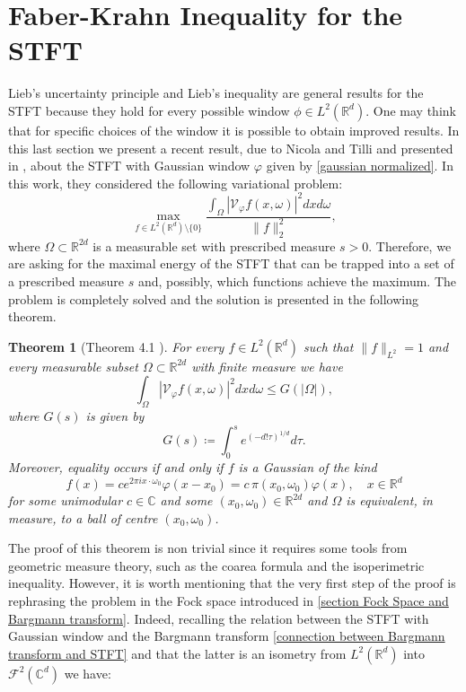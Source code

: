 \documentclass[corpo=11pt, stile=classica, tipotesi=custom,
greek, evenboxes, english]{toptesi}
\numberwithin{equation}{chapter}
\newtheorem{teo}{Theorem}[chapter] %
\theoremstyle{definition}
\theoremstyle{remark}
\newcommand{\R}{\mathbb{R}} %
\newcommand{\V}{\mathcal{V}} %
\newcommand{\Fock}{\mathcal{F}} %
\newcommand{\C}{\mathbb{C}} %
\newcommand{\dxdo}{dxd\omega}
\begin{document}
\section{Faber-Krahn Inequality for the STFT}\label{section Faber-Krahn inequality fot STFT}
Lieb's uncertainty principle and Lieb's inequality are general results for the STFT because they hold for every possible window $\phi \in L^2(\R^d)$. One may think that for specific choices of the window it is possible to obtain improved results. In this last section we present a recent result, due to Nicola and Tilli and presented in \cite{nicolatilli_fk}, about the STFT with Gaussian window $\varphi$ given by \eqref{gaussian normalized}. In this work, they considered the following variational problem: 
\begin{equation}\label{variational problem Faber-Krahn STFT}
	\max_{f \in L^2(\R^d) \setminus \{0\}} \dfrac{\int_{\Omega} |\V_{\varphi} f(x,\omega)|^2 dx d\omega}{\| f\|_2^2},
\end{equation}
where $\Omega \subset \R^{2d}$ is a measurable set with prescribed measure $s > 0$. Therefore, we are asking for the maximal energy of the STFT that can be trapped into a set of a prescribed measure $s$ and, possibly, which functions achieve the maximum. The problem is completely solved and the solution is presented in the following theorem.
\begin{teo}[Theorem 4.1 \cite{nicolatilli_norm}]\label{faberkrahn theorem}
	For every $f \in L^2(\R^d)$ such that $\|f\|_{L^2} = 1$ and every measurable subset $\Omega \subset \R^{2d}$ with finite measure we have
	\begin{equation}\label{bound STFT nicola-tilli}
		\int_{\Omega}  |\V_{\varphi} f(x,\omega)|^2 \dxdo \leq G(|\Omega|),
	\end{equation}
	where $G(s)$ is given by
	\begin{equation}\label{G}
		G(s) \coloneqq \int_0^s e^{\left(-d!\tau\right)^{1/d}} d\tau.
	\end{equation}
	Moreover, equality occurs if and only if $f$ is a Gaussian of the kind
	\begin{equation}\label{translated Gaussian}
		f(x) = c e^{2 \pi i  x \cdot \omega_0} \varphi(x-x_0) = c\, \pi(x_0, \omega_0) \varphi (x), \quad x \in \R^d
	\end{equation}
	for some unimodular $c \in \C$ and some $(x_0,\omega_0) \in  \R^{2d}$ and $\Omega$ is equivalent, in measure, to a ball of centre $(x_0,\omega_0)$.
\end{teo}
The proof of this theorem is non trivial since it requires some tools from geometric measure theory, such as the coarea formula and the isoperimetric inequality. However, it is worth mentioning that the very first step of the proof is rephrasing the problem in the Fock space introduced in \ref{section Fock Space and Bargmann transform}. Indeed, recalling the relation between the STFT with Gaussian window and the Bargmann transform \eqref{connection between Bargmann transform and STFT} and that the latter is an isometry from $L^2(\R^d)$ into $\Fock^2(\C^d)$ we have:
\end{document}
